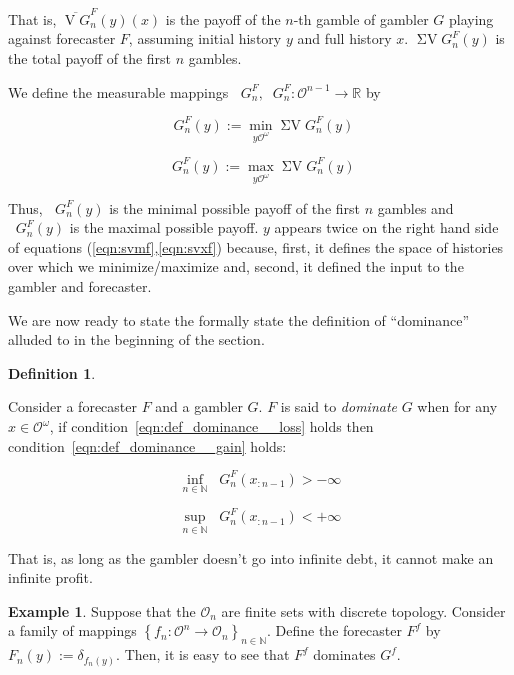 \documentclass[11pt]{article}
\theoremstyle{definition}
\newtheorem{definition}{Definition}%
\newtheorem{example}{Example}%
\theoremstyle{plain}
\newcommand{\Nats}{\mathbb{N}}
\newcommand{\Reals}{\mathbb{R}}
\newcommand{\Ob}{\mathcal{O}}
\newcommand{\OO}{\Ob^\omega}
\DeclareMathOperator{\V}{V}
\DeclareMathOperator{\SV}{\Sigma V}
\DeclareMathOperator{\SVM}{\Sigma V_{\min}}
\DeclareMathOperator{\SVX}{\Sigma V_{\max}}
\begin{document}
That is, $\overline{\V G}^F_n\left(y\right)(x)$ is the payoff of the $n$-th gamble of gambler $G$ playing against forecaster $F$, assuming initial history $y$ and full history $x$. $\SV G^F_n\left(y\right)$ is the total payoff of the first $n$ gambles.

We define the measurable mappings $\SVM G^F_n, \SVX G^F_n: \Ob^{n-1} \rightarrow \Reals$ by

\begin{equation}
\label{eqn:svmf}
\SVM G^F_n\left(y\right):=\min_{y\OO} \SV G^F_n(y)
\end{equation}

\begin{equation}
\label{eqn:svxf}
\SVX G^F_n\left(y\right):=\max_{y\OO} \SV G^F_n(y)
\end{equation}

Thus, $\SVM G^F_n\left(y\right)$ is the minimal possible payoff of the first $n$ gambles and $\SVX G^F_n\left(y\right)$ is the maximal possible payoff. $y$ appears twice on the right hand side of equations (\ref{eqn:svmf},\ref{eqn:svxf}) because, first, it defines the space of histories over which we minimize/maximize and, second, it defined the input to the gambler and forecaster.

We are now ready to state the formally state the definition of \enquote{dominance} alluded to in the beginning of the section.

\begin{definition}
\label{def:dominance}

Consider a forecaster $F$ and a gambler $G$. $F$ is said to \emph{dominate} $G$ when for any $x \in \OO$, if condition~\ref{eqn:def_dominance__loss} holds then condition~\ref{eqn:def_dominance__gain} holds:

\begin{equation}
\label{eqn:def_dominance__loss}
\inf_{n \in \Nats} {\SVM G^F_{n}\left(x_{:n-1}\right)} > -\infty
\end{equation}

\begin{equation}
\label{eqn:def_dominance__gain}
\sup_{n \in \Nats} {\SVX G^F_{n}\left(x_{:n-1}\right)} < +\infty
\end{equation}

\end{definition}

That is, as long as the gambler doesn't go into infinite debt, it cannot make an infinite profit.

\begin{samepage}
\begin{example}

Suppose that the $\Ob_n$ are finite sets with discrete topology. Consider a family of mappings $\left\{f_n: \Ob^n \rightarrow \Ob_n\right\}_{n\in\Nats}$. Define the forecaster $F^f$ by $F_n(y) := \delta_{f_n(y)}$. Then, it is easy to see that $F^f$ dominates $G^f$.

\end{example}
\end{samepage}
\end{document}
